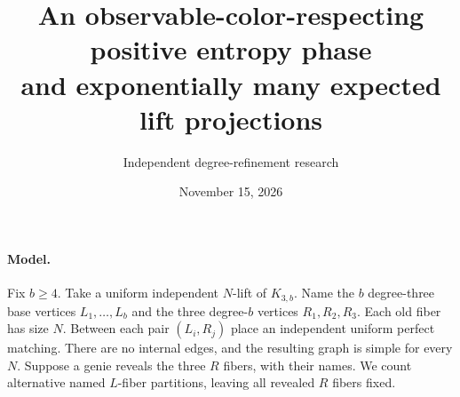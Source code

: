 \documentclass[11pt]{article}
\title{An observable-color-respecting positive entropy phase\protect\\and exponentially many expected lift projections}
\author{Independent degree-refinement research}
\date{November 15, 2026}
\begin{document}
\maketitle

\paragraph{Model.}
Fix $b\ge4$. Take a uniform independent $N$-lift of $K_{3,b}$.
Name the $b$ degree-three base vertices $L_1,\ldots,L_b$ and the
three degree-$b$ vertices $R_1,R_2,R_3$. Each old fiber has size $N$.
Between each pair $(L_i,R_j)$ place an independent uniform perfect
matching. There are no internal edges, and the resulting graph is simple
for every $N$. Suppose a genie reveals the three $R$ fibers, with their
names. We count alternative named $L$-fiber partitions, leaving all
revealed $R$ fibers fixed.
\end{document}
